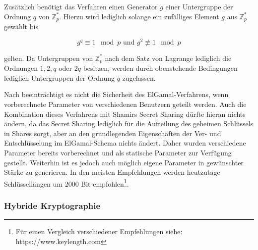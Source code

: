 Zusätzlich benötigt das Verfahren einen Generator \(g\) einer Untergruppe der Ordnung \(q\) von \(\mathbb{Z}_p^*\). Hierzu wird lediglich solange ein zufälliges Element \(g\) aus \(\mathbb{Z}_p^*\) gewählt bis 

\[g^q \equiv 1 \mod p \text{ und } g^2 \not\equiv 1 \mod p\] 

gelten. Da Untergruppen von \(\mathbb{Z}_p^*\) nach dem Satz von Lagrange lediglich die Ordnungen \(1, 2, q\) oder \(2q\) besitzen, werden durch obenstehende Bedingungen lediglich Untergruppen der Ordnung \(q\) zugelassen.

Nach \cite{katz2014} beeinträchtigt es nicht die Sicherheit des ElGamal-Verfahrens, wenn vorberechnete Parameter von verschiedenen Benutzern geteilt werden. Auch die Kombination dieses Verfahrens mit Shamirs Secret Sharing dürfte hieran nichts ändern, da das Secret Sharing lediglich für die Aufteilung des geheimen Schlüssels in Shares sorgt, aber an den grundlegenden Eigenschaften der Ver- und Entschlüsselung im ElGamal-Schema nichts ändert. Daher wurden verschiedene Parameter bereits vorberechnet und als statische Parameter zur Verfügung gestellt. Weiterhin ist es jedoch auch möglich eigene Parameter in gewünschter Stärke zu generieren.  In den meisten Empfehlungen werden heutzutage Schlüssellängen um 2000 Bit empfohlen\footnote{
  Für einen Vergleich verschiedener Empfehlungen siehe: https://www.keylength.com
}.

\subsubsection{Hybride Kryptographie}

\label{sec_impl_threshold_hybrid}
  
%  
%  

